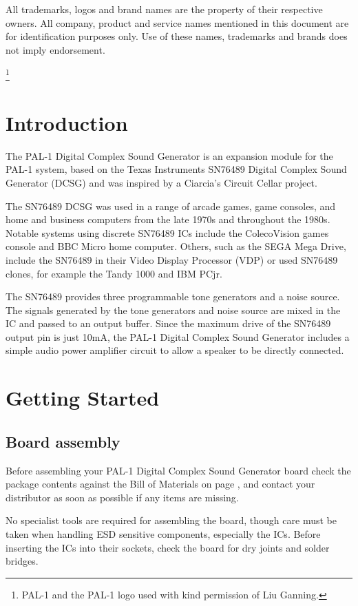 \documentclass[a4paper,11pt,twoside,openright]{report}
\newcommand\mainmatter{
  \cleardoublepage
  \pagenumbering{arabic}}
\begin{document}
All trademarks, logos and brand names are the property of their respective owners. All company, product and service names
mentioned in this document are for identification purposes only. Use of these names, trademarks and brands does not imply 
endorsement.

\thanks{PAL-1 and the PAL-1 logo used with kind permission of Liu Ganning.}
\clearpage
\tableofcontents
\cleardoublepage
\chapter*{Introduction}
The PAL-1 Digital Complex Sound Generator is an expansion module for the PAL-1 system\cite{ganning1}, 
based on the Texas Instruments SN76489 Digital Complex Sound Generator (DCSG)\cite{ti1} and was inspired 
by a Ciarcia's Circuit Cellar project\cite[60-72]{ciarcia1}. 

The SN76489 DCSG was used in a range of arcade games, game consoles, and home and business computers 
from the late 1970s and throughout the 1980s. Notable systems using discrete SN76489 ICs include the 
ColecoVision games console and BBC Micro home computer. Others, such as the SEGA Mega Drive, include 
the SN76489 in their Video Display Processor (VDP) or used SN76489 clones, for example the Tandy 1000 
and IBM PCjr.

The SN76489 provides three programmable tone generators and a noise source. The signals generated by 
the tone generators and noise source are mixed in the IC and passed to an output buffer. Since the 
maximum drive of the SN76489 output pin is just 10mA, the PAL-1 Digital Complex Sound Generator 
includes a simple audio power amplifier circuit to allow a speaker to be directly connected.

\mainmatter
\chapter{Getting Started}
\section*{Board assembly}
Before assembling your PAL-1 Digital Complex Sound Generator board check the package contents against the 
Bill of Materials on page \pageref{sec:bom}, and contact your distributor as soon as possible if any 
items are missing.

No specialist tools are required for assembling the board, though care must be taken when handling ESD 
sensitive components, especially the ICs. Before inserting the ICs into their sockets, check the board 
for dry joints and solder bridges. 
\end{document}
